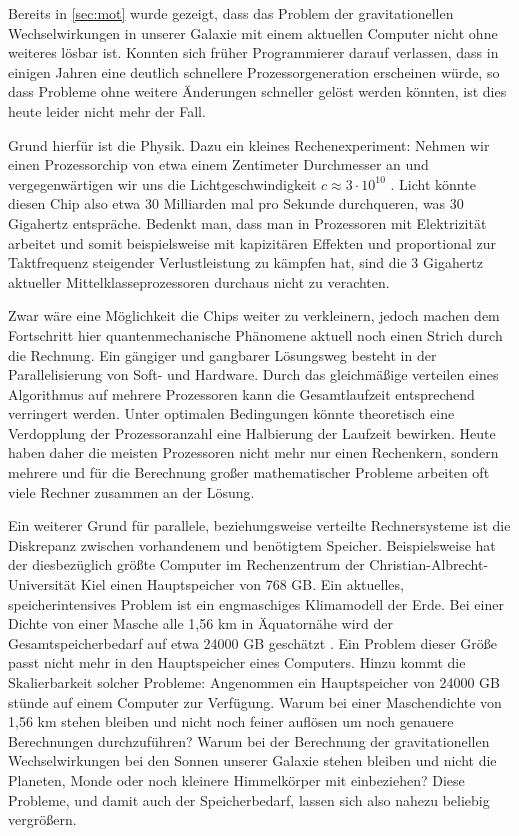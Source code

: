 Bereits in \autoref{sec:mot} wurde gezeigt, dass das Problem der gravitationellen Wechselwirkungen in unserer Galaxie mit einem aktuellen Computer nicht ohne 
    weiteres lösbar ist. 
    Konnten sich früher Programmierer darauf verlassen, dass in einigen Jahren eine deutlich schnellere Prozessorgeneration erscheinen würde, so dass Probleme ohne 
    weitere Änderungen schneller gelöst werden könnten, ist dies heute leider nicht mehr der Fall. 
    
    Grund hierfür ist die Physik. Dazu ein kleines Rechenexperiment: Nehmen wir einen Prozessorchip von etwa einem Zentimeter Durchmesser an und vergegenwärtigen wir 
    uns die Lichtgeschwindigkeit $c \approx 3\cdot10^{10}$ \citep{light}. Licht könnte diesen Chip also etwa 30 Milliarden mal pro Sekunde durchqueren, was 30 Gigahertz
    entspräche. Bedenkt man, dass man in Prozessoren mit Elektrizität arbeitet und somit beispielsweise mit kapizitären Effekten und proportional zur Taktfrequenz steigender
    Verlustleistung zu kämpfen hat, sind die 3 Gigahertz aktueller Mittelklasseprozessoren durchaus nicht zu verachten.
    
    Zwar wäre eine Möglichkeit die Chips weiter zu verkleinern, jedoch machen dem Fortschritt hier quantenmechanische Phänomene aktuell noch einen Strich durch die Rechnung.
    Ein gängiger und gangbarer Lösungsweg besteht in der Parallelisierung von Soft- und Hardware. Durch das gleichmäßige verteilen eines Algorithmus auf mehrere Prozessoren
    kann die Gesamtlaufzeit entsprechend verringert werden. Unter optimalen Bedingungen könnte theoretisch eine Verdopplung der Prozessoranzahl eine Halbierung der Laufzeit
    bewirken. Heute haben daher die meisten Prozessoren nicht mehr nur einen Rechenkern, sondern mehrere und für die Berechnung großer mathematischer Probleme arbeiten oft viele
    Rechner zusammen an der Lösung.\citep{hpcskript}
    
    Ein weiterer Grund für parallele, beziehungsweise verteilte Rechnersysteme ist die Diskrepanz zwischen vorhandenem und benötigtem Speicher. Beispielsweise hat der diesbezüglich größte
    Computer im Rechenzentrum der Christian-Albrecht-Universität Kiel einen Hauptspeicher von 768 GB. Ein aktuelles, speicherintensives Problem ist ein engmaschiges 
    Klimamodell der Erde. Bei einer Dichte von einer Masche alle 1,56 km in Äquatornähe wird der Gesamtspeicherbedarf auf etwa 24000 GB geschätzt \citep{climate}. Ein Problem
    dieser Größe passt nicht mehr in den Hauptspeicher eines Computers.
    Hinzu kommt die Skalierbarkeit solcher Probleme: Angenommen ein Hauptspeicher von 24000 GB stünde auf einem Computer zur Verfügung. Warum bei einer Maschendichte von 
    1,56 km stehen bleiben und nicht noch feiner auflösen um noch genauere Berechnungen durchzuführen?
    Warum bei der Berechnung der gravitationellen Wechselwirkungen bei den Sonnen unserer Galaxie stehen bleiben und nicht die Planeten, Monde oder noch kleinere Himmelkörper mit einbeziehen? 
    Diese Probleme, und damit auch der Speicherbedarf, lassen sich also nahezu beliebig vergrößern.
    
